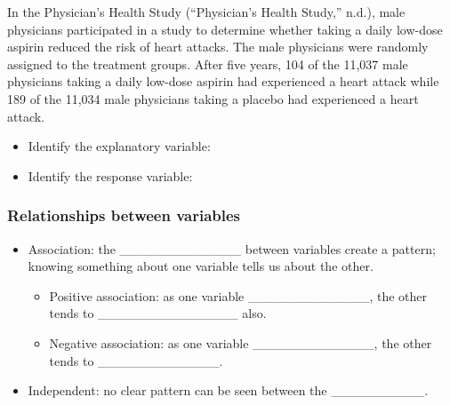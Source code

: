 \documentclass[
]{report}
\providecommand{\tightlist}{%
  \setlength{\itemsep}{0pt}\setlength{\parskip}{0pt}}
\begin{document}
\vspace{0.25in}

In the Physician's Health Study ({``Physician's Health Study,''} n.d.), male physicians participated in a study to determine whether taking a daily low-dose aspirin reduced the risk of heart attacks. The male physicians were randomly assigned to the treatment groups. After five years, 104 of the 11,037 male physicians taking a daily low-dose aspirin had experienced a heart attack while 189 of the 11,034 male physicians taking a placebo had experienced a heart attack.

\begin{itemize}
\tightlist
\item
  Identify the explanatory variable:
\end{itemize}

\vspace{0.25in}

\begin{itemize}
\tightlist
\item
  Identify the response variable:
\end{itemize}

\vspace{0.25in}

\subsubsection*{Relationships between variables}\label{relationships-between-variables}


\begin{itemize}
\item
  Association: the \_\_\_\_\_\_\_\_\_\_\_\_\_ between variables create a pattern; knowing something about one variable tells us about the other.

  \begin{itemize}
  \item
    Positive association: as one variable \_\_\_\_\_\_\_\_\_\_\_\_\_, the other tends to \_\_\_\_\_\_\_\_\_\_\_\_\_\_\_ also.
  \item
    Negative association: as one variable \_\_\_\_\_\_\_\_\_\_\_\_\_, the other tends to \_\_\_\_\_\_\_\_\_\_\_\_\_.
  \end{itemize}
\item
  Independent: no clear pattern can be seen between the \_\_\_\_\_\_\_\_\_\_.
\end{itemize}
\end{document}
